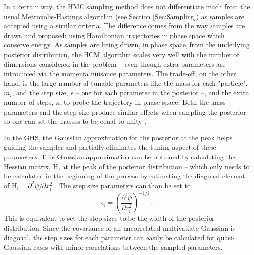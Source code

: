 \qquad In a certain way, the HMC sampling method does not differentiate much from the usual Metropolis-Hastings algorithm (see Section \ref{Sec:Sampling}) as samples are accepted using a similar criteria. The difference comes from the way samples are drawn and proposed: using Hamiltonian trajectories in phase space which conserve energy. As samples are being drawn, in phase space, from the underlying posterior distribution, the HCM algorithm scales very well with the number of dimensions considered in the problem -- even though extra parameters are introduced via the momenta nuisance parameters. The trade-off, on the other hand, is the large number of tunable parameters like the mass for each "particle", $m_i$, and the step size, $\epsilon$ -- one for each parameter in the posterior --, and the extra number of steps, $n$, to probe the trajectory in phase space. Both the mass parameters and the step size produce similar effects when sampling the posterior so one can set the masses to be equal to unity \citep{Neal1996}. 

\qquad In the GHS, the Gaussian approximation for the posterior at the peak helps guiding the sampler and partially eliminates the tuning aspect of these parameters. This Gaussian approximation can be obtained by calculating the Hessian matrix, $\bm{\mathrm{H}}$, at the peak of the posterior distribution -- which only needs to be calculated in the beginning of the process by estimating the diagonal element of $\mathrm{H}_i = \partial^2 \psi/\partial x_i^2$ \citep{SreeThesis,2013-GuidedHamiltonian}. The step size parameters can than be set to
\begin{equation}
    \label{Eq:BPL:StepSizeVector}
    \epsilon_i = \left( \frac{\partial^2 \psi}{\partial x_i^2}\right)^{-1/2}\, .
\end{equation}
This is equivalent to set the step sizes to be the width of the posterior distribution. Since the covariance of an uncorrelated multivatiate Gaussian is diagonal, the step sizes for each parameter can easily be calculated for quasi-Gaussian cases with minor correlations between the sampled parameters. 

